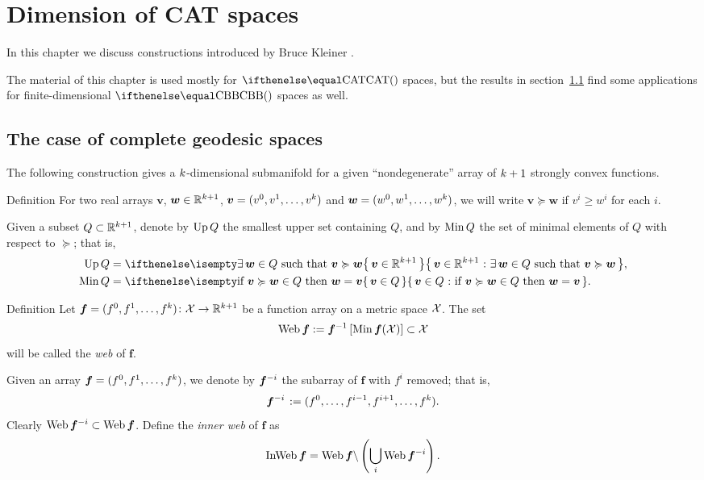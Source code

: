 \chapter{Dimension of CAT spaces}\label{chap:web+bary}

In this chapter we discuss  constructions introduced by Bruce Kleiner \cite{kleiner}.

The material of this chapter is used mostly for $\CAT{}$ spaces, 
but the results in section~\ref{sec:web-general} find some applications for finite-dimensional $\Alex{}$ spaces as well.

\section{The case of complete geodesic spaces}\label{sec:web-general}

The following construction gives a $k$-dimensional submanifold 
for a given ``nondegenerate'' array of $k+1$ strongly convex functions.

\begin{thm}{Definition}\label{def:ordung}
For two real arrays $\bm{v}$, $\bm{w}\in \RR^{\kay+1}$,
$\bm{v}=(v^0,v^1,\dots,v^\kay)$ 
and 
$\bm{w}=(w^0,w^1,\dots,w^\kay)$, 
we will write
$\bm{v}\succcurlyeq\bm{w}$ if $v^i\ge w^i$ for each $i$.
\end{thm}

Given a subset $Q\subset \RR^{\kay+1}$, 
denote by $\mathop{\rm Up}\nolimits Q$ \label{PAGE.def:Up}
the smallest upper set containing $Q$,  
and by 
$\mathop{\rm Min}\nolimits Q$ the set of minimal elements of $Q$ with respect to $\succcurlyeq$;
that is,
\begin{align*}
\Up Q 
&=
\set{\bm{v}\in\RR^{\kay+1}}{\exists\, \bm{w}\in Q\ \text{such that}\ \bm{v}\succcurlyeq\bm{w}},
\\
\Min Q 
&=
\set{\bm{v}\in Q}{\text{if}\ \bm{v}\succcurlyeq\bm{w}\in Q\ \text{then}\ \bm{w}=\bm{v}}.
\end{align*}


\begin{thm}{Definition}\label{def:web}
Let  $\bm{f}=(f^0,f^1,\dots,f^\kay)\:\spc{X}\to \RR^{\kay+1}$ be a function array on a metric space $\mathcal{X}$.
The set 
\[\Web\bm{f}
\df
\bm{f}^{-1}\left[\Min\bm{f}(\spc{X})\right]
\subset 
\spc{X}\] 
will be called the \emph{web} of $\bm{f}$.
\end{thm}

Given an array $\bm{f}=(f^0,f^1,\dots,f^\kay)$,
we denote by $\bm{f}^{{-} i}$ the subarray of $\bm{f}$ with $f^i$ removed;
that is, 
\[\bm{f}^{\without i\,}\df(f^0,\dots,f^{i-1},f^{i+1},\dots,f^\kay).\]
Clearly 
$\Web\bm{f}^{\without i}\subset \Web\bm{f}$.
Define the \emph{inner web} of $\bm{f}$ 
as 
\[\mathop{\rm InWeb}\nolimits\bm{f}
=
\mathop{\rm Web}\nolimits\bm{f}\backslash\left(\bigcup_{i}\mathop{\rm Web}\nolimits\bm{f}^{{-} i}\right).\]


